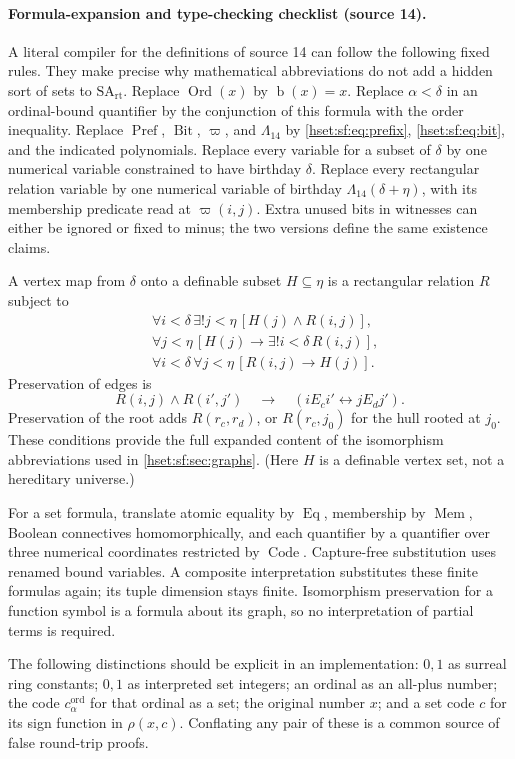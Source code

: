 \documentclass[11pt,letterpaper]{article}
\theoremstyle{definition}
\theoremstyle{remark}
\newcommand{\Ord}{\operatorname{Ord}}
\newcommand{\bd}{\operatorname{b}}
\newcommand{\Code}{\operatorname{Code}}
\newcommand{\Bit}{\operatorname{Bit}}
\newcommand{\Prefp}{\operatorname{Pref}}
\newcommand{\Eqc}{\operatorname{Eq}}
\newcommand{\Memc}{\operatorname{Mem}}
\newcommand{\SArt}{\mathrm{SA}_{\mathrm{rt}}}
\begin{document}
\paragraph{Formula-expansion and type-checking checklist (source 14).} A literal
compiler for the definitions of source 14 can follow the following fixed rules. They
make precise why mathematical abbreviations do not add a hidden sort of sets to
$\SArt$. Replace $\Ord(x)$ by $\bd(x)=x$. Replace $\alpha<\delta$ in an ordinal-bound
quantifier by the conjunction of this formula with the order inequality. Replace
$\Prefp$, $\Bit$, $\varpi$, and $\Lambda_{14}$ by \eqref{hset:sf:eq:prefix},
\eqref{hset:sf:eq:bit}, and the indicated polynomials. Replace every variable for a
subset of $\delta$ by one numerical variable constrained to have birthday $\delta$.
Replace every rectangular relation variable by one numerical variable of birthday
$\Lambda_{14}(\delta+\eta)$, with its membership predicate read at $\varpi(i,j)$.
Extra unused bits in witnesses can either be ignored or fixed to minus; the two
versions define the same existence claims.

A vertex map from $\delta$ onto a definable subset $H\subseteq\eta$ is a rectangular
relation $R$ subject to
\begin{align*}
 &\forall i<\delta\,\exists!j<\eta\,[H(j)\land R(i,j)],\\
 &\forall j<\eta\,[H(j)\to\exists!i<\delta\,R(i,j)],\\
 &\forall i<\delta\,\forall j<\eta\,[R(i,j)\to H(j)].
\end{align*}
Preservation of edges is
\[
 R(i,j)\land R(i',j')\quad\longrightarrow\quad(iE_ci'\leftrightarrow jE_dj').
\]
Preservation of the root adds $R(r_c,r_d)$, or $R(r_c,j_0)$ for the hull rooted at
$j_0$. These conditions provide the full expanded content of the isomorphism
abbreviations used in \cref{hset:sf:sec:graphs}. (Here $H$ is a definable vertex set,
not a hereditary universe.)

For a set formula, translate atomic equality by $\Eqc$, membership by $\Memc$,
Boolean connectives homomorphically, and each quantifier by a quantifier over three
numerical coordinates restricted by $\Code$. Capture-free substitution uses renamed
bound variables. A composite interpretation substitutes these finite formulas again;
its tuple dimension stays finite. Isomorphism preservation for a function symbol is a
formula about its graph, so no interpretation of partial terms is required.

The following distinctions should be explicit in an implementation: $0,1$ as surreal
ring constants; $0,1$ as interpreted set integers; an ordinal as an all-plus number;
the code $c^{\mathrm{ord}}_\alpha$ for that ordinal as a set; the original number
$x$; and a set code $c$ for its sign function in $\rho(x,c)$. Conflating any pair of
these is a common source of false round-trip proofs.
\end{document}
